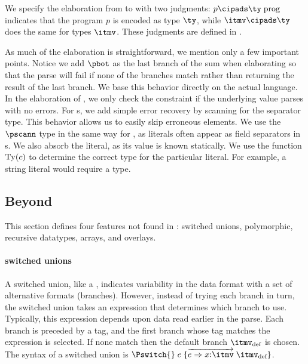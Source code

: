 We specify the elaboration from \ipads{} to \ddc{} with two judgments:
 $p \cipads \ty\; \text{prog}$ indicates that the \ipads{} program
$p$ is encoded as \ddc{} type $\ty$, while $\itmv \cipads \ty$
does the same for \ipads{} types $\itmv$. These judgments are defined
in .

As much of the elaboration is straightforward, we mention only a few
important points. Notice we add $\pbot$ as the
last branch of the \ddc{} sum when elaborating \Punion{} so that the
parse will fail if none of the branches match rather than returning
the result of the last branch. We base this behavior
  directly on the actual \padsc{} language. In the elaboration of
\Pwhere{}, we only check the constraint if the underlying value parses
with no errors. For \Parray{}s, we add simple error recovery by
scanning for the separator type.  This behavior allows us to easily
skip erroneous elements. We use the $\pscann$ type in the same way for
, as literals often appear as field separators in
\Pstruct{}s.  We also absorb the literal, as its value is known
statically.  We use the function ${\rm Ty}(c)$ to determine the
correct type for the particular literal. For example, a string
literal would require a \Pstring{} type.

\subsection{Beyond \ipads{}}

This section defines four features not found in \ipads{}: \padsc{}
switched unions, \padsml{} polymorphic, recursive datatypes,
\datascript{} arrays, and \packettypes{} overlays.

\paragraph*{\padsc{} switched unions}
A switched union, like a \Punion, indicates variability in the data
format with a set of alternative formats (branches). However, instead
of trying each branch in turn, the switched union takes an expression that
determines which branch to use. Typically, this expression depends upon data read earlier in the parse. Each branch is preceded by a tag,
and the first branch whose tag matches the expression is selected.
If none match then the default branch $\itmv_{\text{def}}$ is chosen.
The syntax of a switched union is $\Pswitch{}\;e\;\{\overrightarrow{e
  \Rightarrow x{:}\itmv}\; \itmv_{\text{def}}\}$.

